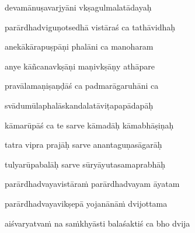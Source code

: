 devamānuṣavarjyāni vkṣagulmalatādayaḥ \veg\dontdisplaylinenum
{}

parārdhadviguṇotsedhā vistāraś ca tathāvidhaḥ\thinspace{\dandab} \dontdisplaylinenum
{}

anekākārapuṣpāṇi phalāni ca manoharam \veg\dontdisplaylinenum
{}

anye kāñcanavkṣāṇi maṇivkṣāṇy athāpare\thinspace{\dandab} \dontdisplaylinenum
{}

pravālamaṇiṣaṇḍāś ca padmarāgaruhāni ca \veg\dontdisplaylinenum
{}

svādumūlaphalāskandalatāviṭapapādapāḥ\thinspace{\dandab} \dontdisplaylinenum
{}

kāmarūpāś ca te sarve kāmadāḥ kāmabhāṣiṇaḥ \veg\dontdisplaylinenum

tatra vipra prajāḥ sarve anantaguṇasāgarāḥ\thinspace{\dandab} \dontdisplaylinenum

tulyarūpabalāḥ sarve sūryāyutasamaprabhāḥ \veg\dontdisplaylinenum
{}

parārdhadvayavistāraṁ parārdhadvayam āyatam\thinspace{\dandab} \dontdisplaylinenum

parārdhadvayavikṣepā yojanānāṁ dvijottama \veg\dontdisplaylinenum
{}

aiśvaryatvaṁ na saṁkhyāsti balaśaktiś ca bho dvija\thinspace{\dandab} \dontdisplaylinenum
{}

